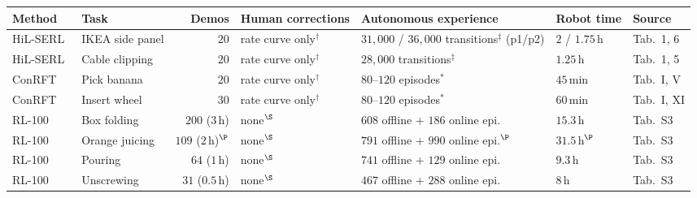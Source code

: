 \begin{tabular}{llDIAWl}
    \hline
    Method                          & Task            & Demos                 & Human corrections                                                  & Autonomous experience                                    & Robot time                            & Source      \\
    \hline
    HiL-SERL~\citep{luo2024hilserl} & IKEA side panel & $20$                  & rate curve only$^{\dagger}$                                        & $31{,}000$ / $36{,}000$ transitions$^{\ddagger}$ (p1/p2) & $2$ / $1.75$\,h                       & Tab.\ 1, 6  \\
    HiL-SERL~\citep{luo2024hilserl} & Cable clipping  & $20$                  & rate curve only$^{\dagger}$                                        & $28{,}000$ transitions$^{\ddagger}$                      & $1.25$\,h                             & Tab.\ 1, 5  \\
    ConRFT~\citep{chen2025conrft}   & Pick banana     & $20$                  & rate curve only$^{\dagger}$                                        & $80$--$120$ episodes$^{*}$                               & $45$\,min                             & Tab.\ I, V  \\
    ConRFT~\citep{chen2025conrft}   & Insert wheel    & $30$                  & rate curve only$^{\dagger}$                                        & $80$--$120$ episodes$^{*}$                               & $60$\,min                             & Tab.\ I, XI \\
    RL-100~\citep{lei2025rl100}     & Box folding     & $200$ ($3$\,h)        & none$^{\S}$                                                        & $608$ offline + $186$ online epi.                        & $15.3$\,h                             & Tab.\ S3    \\
    RL-100~\citep{lei2025rl100}     & Orange juicing  & $109$ ($2$\,h)$^{\P}$ & none$^{\S}$                                                        & $791$ offline + $990$ online epi.$^{\P}$                 & $31.5$\,h$^{\P}$                      & Tab.\ S3    \\
    RL-100~\citep{lei2025rl100}     & Pouring         & $64$ ($1$\,h)         & none$^{\S}$                                                        & $741$ offline + $129$ online epi.                        & $9.3$\,h                              & Tab.\ S3    \\
    RL-100~\citep{lei2025rl100}     & Unscrewing      & $31$ ($0.5$\,h)       & none$^{\S}$                                                        & $467$ offline + $288$ online epi.                        & $8$\,h                                & Tab.\ S3    \\

\end{tabular}
